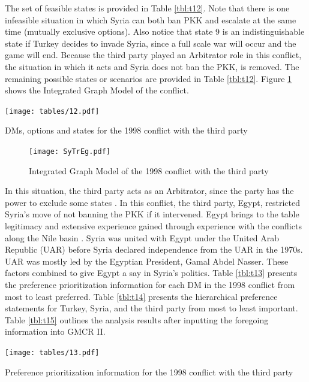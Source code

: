 \documentclass[letterpaper,12pt,titlepage,oneside,final]{book}
\begin{document}
The set of feasible states is provided in Table \ref{tbl:t12}. Note that there is one infeasible situation in which Syria can both ban PKK and escalate at the same time (mutually exclusive options). Also notice that state 9 is an indistinguishable state if Turkey decides to invade Syria, since a full scale war will occur and the game will end.  Because the third party played an Arbitrator role in this conflict, the situation in which it acts and Syria does not ban the PKK, is removed. The remaining possible states or scenarios are provided in Table \ref{tbl:t12}. Figure \ref{fig:SyTrGM} shows the Integrated Graph Model of the conflict.

\begin{table}[H]
\centering
\texttt{[image: tables/12.pdf]}

\caption{DMs, options and states for the 1998 conflict with the third party}

\label{tbl:t12}
\end{table}

\begin{center}
\begin{figure}[H]
\centering
\texttt{[image: SyTrEg.pdf]}

\caption{Integrated Graph Model of the 1998 conflict with the third party}

\label{fig:SyTrGM}
\end{figure}
\end{center}

In this situation, the third party acts as an Arbitrator, since the party has the power to exclude some states \citep{sakamoto2005}. In this conflict, the third party, Egypt, restricted Syria's move of not banning the PKK if it intervened. Egypt brings to the table legitimacy and extensive experience gained through experience with the conflicts along the Nile basin \citep{akanda2007tigris}. Syria was united with Egypt under the United Arab Republic (UAR) before Syria declared independence from the UAR in the 1970s. UAR was mostly led by the Egyptian President, Gamal Abdel Nasser. These factors combined to give Egypt a say in Syria's politics. Table \ref{tbl:t13} presents the preference prioritization information for each DM in the 1998 conflict from most to least preferred. Table \ref{tbl:t14} presents the hierarchical preference statements for Turkey, Syria, and the third party from most to least important. Table \ref{tbl:t15} outlines the analysis results after inputting the foregoing information into GMCR II. 

\begin{table}[H]
\centering
\texttt{[image: tables/13.pdf]}

\caption{Preference prioritization information for the 1998 conflict with the third party}

\label{tbl:t13}
\end{table}
\end{document}
